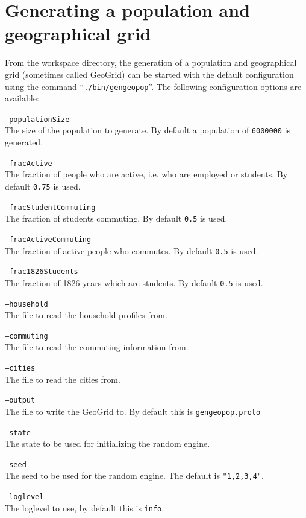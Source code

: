 \section{Generating a population and geographical grid}

From the workspace directory, the generation of a population and geographical grid (sometimes called GeoGrid) can be started with the default configuration using the command \mbox{``\texttt{./bin/gengeopop}''}. The following configuration options are available:

\begin{compactdesc}
    \item[\texttt{--populationSize}] \ \\
        The size of the population to generate. By default a population of \texttt{6000000} is generated.
    \item[\texttt{--fracActive}] \ \\
        The fraction of people who are active, i.e. who are employed or students. By default \texttt{0.75} is used.
    \item[\texttt{--fracStudentCommuting}] \ \\
        The fraction of students commuting. By default \texttt{0.5} is used.
    \item[\texttt{--fracActiveCommuting}] \ \\
        The fraction of active people who commutes. By default \texttt{0.5} is used.
    \item[\texttt{--frac1826Students}] \ \\
        The fraction of 1826 years which are students. By default \texttt{0.5} is used.
    \item[\texttt{--household}] \ \\
        The file to read the household profiles from.
    \item[\texttt{--commuting}] \ \\
        The file to read the commuting information from.
    \item[\texttt{--cities}] \ \\
        The file to read the cities from.
    \item[\texttt{--output}] \ \\
        The file to write the GeoGrid to. By default this is \texttt{gengeopop.proto}
    \item[\texttt{--state}] \ \\
        The state to be used for initializing the random engine. 
    \item[\texttt{--seed}] \ \\
        The seed to be used for the random engine. The default is \texttt{"1,2,3,4"}.
    \item[\texttt{--loglevel}] \ \\
        The loglevel to use, by default this is \texttt{info}.
\end{compactdesc}

